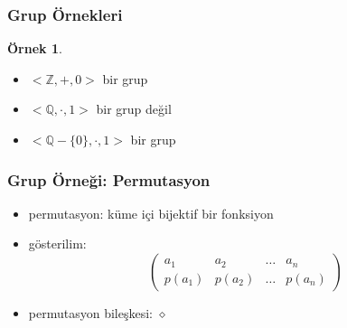 \documentclass[dvipsnames]{beamer}
\theoremstyle{definition}
\theoremstyle{example}
\newtheorem{ornek}[theorem]{Örnek}
\theoremstyle{plain}
\begin{document}
\begin{frame}
  \frametitle{Grup Örnekleri}

  \begin{ornek}
    \begin{itemize}
      \item  $<\mathbb{Z},+,0>$ bir grup

      \pause
      \medskip
      \item $<\mathbb{Q},\cdot,1>$ bir grup değil
      \item $<\mathbb{Q}-\{0\},\cdot,1>$ bir grup
    \end{itemize}
  \end{ornek}
\end{frame}

\begin{frame}
  \frametitle{Grup Örneği: Permutasyon}

  \begin{itemize}
    \item permutasyon: küme içi bijektif bir fonksiyon

    \medskip
    \item gösterilim:
    \[\left(
      \begin{array}{cccc}
         a_1   &  a_2   & \dots &  a_n\\
        p(a_1) & p(a_2) & \dots & p(a_n)
      \end{array}
    \right)\]

    \pause
    \medskip
    \item permutasyon bileşkesi: $\diamond$
  \end{itemize}
\end{frame}
\end{document}
